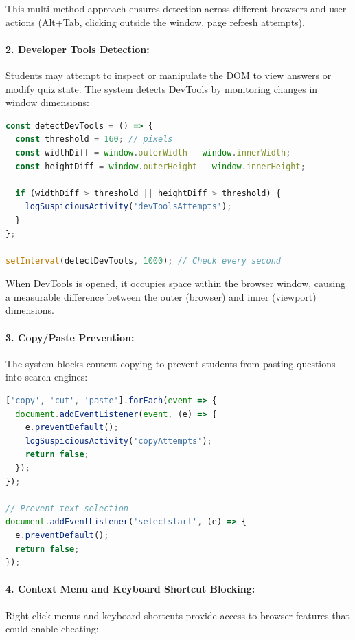 This multi-method approach ensures detection across different browsers and user actions (Alt+Tab, clicking outside the window, page refresh attempts).

\paragraph{2. Developer Tools Detection:}
Students may attempt to inspect or manipulate the DOM to view answers or modify quiz state. The system detects DevTools by monitoring changes in window dimensions:

\begin{lstlisting}[language=JavaScript, caption={DevTools Detection via Window Size Analysis}]
const detectDevTools = () => {
  const threshold = 160; // pixels
  const widthDiff = window.outerWidth - window.innerWidth;
  const heightDiff = window.outerHeight - window.innerHeight;
  
  if (widthDiff > threshold || heightDiff > threshold) {
    logSuspiciousActivity('devToolsAttempts');
  }
};

setInterval(detectDevTools, 1000); // Check every second
\end{lstlisting}

When DevTools is opened, it occupies space within the browser window, causing a measurable difference between the outer (browser) and inner (viewport) dimensions.

\paragraph{3. Copy/Paste Prevention:}
The system blocks content copying to prevent students from pasting questions into search engines:

\begin{lstlisting}[language=JavaScript, caption={Clipboard Event Blocking}]
['copy', 'cut', 'paste'].forEach(event => {
  document.addEventListener(event, (e) => {
    e.preventDefault();
    logSuspiciousActivity('copyAttempts');
    return false;
  });
});

// Prevent text selection
document.addEventListener('selectstart', (e) => {
  e.preventDefault();
  return false;
});
\end{lstlisting}

\paragraph{4. Context Menu and Keyboard Shortcut Blocking:}
Right-click menus and keyboard shortcuts provide access to browser features that could enable cheating:

